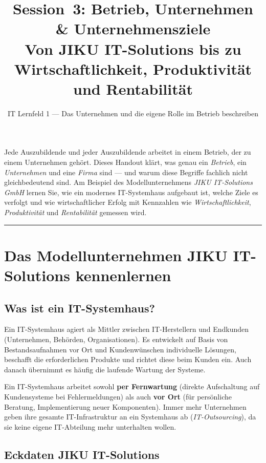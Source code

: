 \documentclass[11pt, a4paper]{article}
\title{\vspace*{-1.5cm}\Huge\bfseries\color{bfwPrimaryDark}Session~3: Betrieb, Unternehmen \& Unternehmensziele\\[0.4em]
  \large\color{bfwInkSoft}\textnormal{Von JIKU IT-Solutions bis zu Wirtschaftlichkeit, Produktivität und Rentabilität}}
\author{\textsf{IT Lernfeld 1 --- Das Unternehmen und die eigene Rolle im Betrieb beschreiben}}
\date{}
\begin{document}
\maketitle
\thispagestyle{empty}

\vspace{1em}
\begin{merksatz}[title={\bfseries Worum geht es in dieser Session?}]
Jede Auszubildende und jeder Auszubildende arbeitet in einem Betrieb, der zu einem Unternehmen gehört.
Dieses Handout klärt, was genau ein \emph{Betrieb}, ein \emph{Unternehmen} und eine \emph{Firma}
sind --- und warum diese Begriffe fachlich nicht gleichbedeutend sind. Am Beispiel des
Modellunternehmens \emph{JIKU IT-Solutions GmbH} lernen Sie, wie ein modernes IT-Systemhaus
aufgebaut ist, welche Ziele es verfolgt und wie wirtschaftlicher Erfolg mit Kennzahlen wie
\emph{Wirtschaftlichkeit}, \emph{Produktivität} und \emph{Rentabilität} gemessen wird.
\end{merksatz}

\tableofcontents
\vspace{1em}
\hrule
\vspace{1em}

\section{Das Modellunternehmen JIKU IT-Solutions kennenlernen}

\subsection{Was ist ein IT-Systemhaus?}

Ein IT-Systemhaus agiert als Mittler zwischen IT-Herstellern und Endkunden (Unternehmen, Behörden,
Organisationen). Es entwickelt auf Basis von Bestandsaufnahmen vor Ort und Kundenwünschen individuelle
Lösungen, beschafft die erforderlichen Produkte und richtet diese beim Kunden ein. Auch danach übernimmt
es häufig die laufende Wartung der Systeme.

Ein IT-Systemhaus arbeitet sowohl \textbf{per Fernwartung} (direkte Aufschaltung auf Kundensysteme bei
Fehlermeldungen) als auch \textbf{vor Ort} (für persönliche Beratung, Implementierung neuer Komponenten).
Immer mehr Unternehmen geben ihre gesamte IT-Infrastruktur an ein Systemhaus ab
(\emph{IT-Outsourcing}), da sie keine eigene IT-Abteilung mehr unterhalten wollen.

\subsection{Eckdaten JIKU IT-Solutions}
\end{document}
